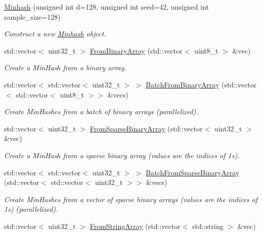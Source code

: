 \begin{DoxyCompactItemize}
\item 
\hyperlink{classtmap_1_1Minhash_ae35f57de5ec2316538384c9d2f588d52}{Minhash} (unsigned int d=128, unsigned int seed=42, unsigned int sample\+\_\+size=128)
\begin{DoxyCompactList}\small\item\em Construct a new \hyperlink{classtmap_1_1Minhash}{Minhash} object. \end{DoxyCompactList}\item 
std\+::vector$<$ uint32\+\_\+t $>$ \hyperlink{classtmap_1_1Minhash_a1418049bb8c8f70255c336e58a9b9fec}{From\+Binary\+Array} (std\+::vector$<$ uint8\+\_\+t $>$ \&vec)
\begin{DoxyCompactList}\small\item\em Create a Min\+Hash from a binary array. \end{DoxyCompactList}\item 
std\+::vector$<$ std\+::vector$<$ uint32\+\_\+t $>$ $>$ \hyperlink{classtmap_1_1Minhash_a083c1328a9830ec585613c213b1730cc}{Batch\+From\+Binary\+Array} (std\+::vector$<$ std\+::vector$<$ uint8\+\_\+t $>$$>$ \&vecs)
\begin{DoxyCompactList}\small\item\em Create Min\+Hashes from a batch of binary arrays (parallelized). \end{DoxyCompactList}\item 
std\+::vector$<$ uint32\+\_\+t $>$ \hyperlink{classtmap_1_1Minhash_aec48525d1c8006f573b0c534e53d894a}{From\+Sparse\+Binary\+Array} (std\+::vector$<$ uint32\+\_\+t $>$ \&vec)
\begin{DoxyCompactList}\small\item\em Create a Min\+Hash from a sparse binary array (values are the indices of 1s). \end{DoxyCompactList}\item 
std\+::vector$<$ std\+::vector$<$ uint32\+\_\+t $>$ $>$ \hyperlink{classtmap_1_1Minhash_a490cf682e7445393fcf2908d74498ea5}{Batch\+From\+Sparse\+Binary\+Array} (std\+::vector$<$ std\+::vector$<$ uint32\+\_\+t $>$$>$ \&vecs)
\begin{DoxyCompactList}\small\item\em Create Min\+Hashes from a vector of sparse binary arrays (values are the indices of 1s) (parallelized). \end{DoxyCompactList}\item 
std\+::vector$<$ uint32\+\_\+t $>$ \hyperlink{classtmap_1_1Minhash_ab21e92280c7265a8df9477734361b8fc}{From\+String\+Array} (std\+::vector$<$ std\+::string $>$ \&vec)

\end{DoxyCompactItemize}
